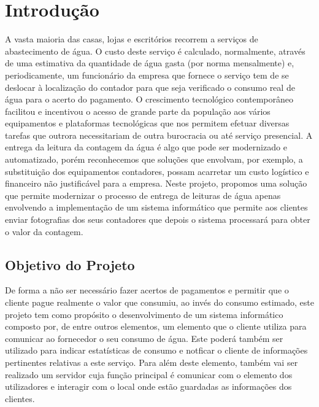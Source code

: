 %
%
\chapter{Introdução} \label{cap:intro}

A vasta maioria das casas, lojas e escritórios recorrem a serviços de abastecimento de água. O custo deste serviço é calculado, normalmente, através de uma estimativa da quantidade de água gasta (por norma mensalmente) e, periodicamente, um funcionário da empresa que fornece o serviço tem de se deslocar à localização do contador para que seja verificado o consumo real de água para o acerto do pagamento. 
O crescimento tecnológico contemporâneo facilitou e incentivou o acesso de grande parte da população aos vários equipamentos e plataformas tecnológicas que nos permitem efetuar diversas tarefas que outrora necessitariam de outra burocracia ou até serviço presencial. A entrega da leitura da contagem da água é algo que pode ser modernizado e automatizado, porém reconhecemos que soluções que envolvam, por exemplo, a substituição dos equipamentos contadores, possam acarretar um custo logístico e financeiro não justificável para a empresa. 
Neste projeto, propomos uma solução que permite modernizar o processo de entrega de leituras de água apenas envolvendo a implementação de um sistema informático que permite aos clientes enviar fotografias dos seus contadores que depois o sistema processará para obter o valor da contagem.


%
%
\section{Objetivo do Projeto} \label{sec11}

De forma a não ser necessário fazer acertos de pagamentos e permitir que o cliente pague realmente o valor que consumiu, ao invés do consumo estimado, este projeto tem como propósito o desenvolvimento de um sistema informático composto por, de entre outros elementos, um elemento que o cliente utiliza para comunicar ao fornecedor o seu consumo de água. Este poderá também ser utilizado para indicar estatísticas de consumo e notficar o cliente de informações pertinentes relativas a este serviço. Para além deste elemento, também vai ser realizado um servidor cuja função principal é comunicar com o elemento dos utilizadores e interagir com o local onde estão guardadas as informações dos clientes.

